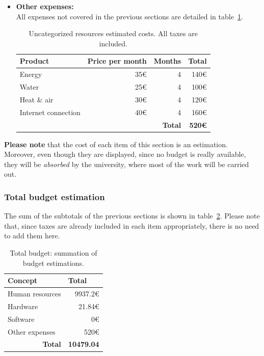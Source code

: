 \begin{itemize}
	\item \textbf{Other expenses:}\\
	All expenses not covered in the previous sections are detailed in table~\ref{table:other-resources}.
	\begin{table}[h]
	\centering
	\begin{tabular}{lrrr}
	\hline
	\textbf{Product} & \multicolumn{1}{l}{\textbf{Price per month}} & \multicolumn{1}{l}{\textbf{Months}} & \multicolumn{1}{l}{\textbf{Total}} \\ \hline
	Energy & 35€ & 4 & 140€ \\
	Water & 25€ & 4 & 100€ \\
	Heat \& air & 30€ & 4 & 120€ \\
	Internet connection & 40€ & 4 & 160€ \\ \hline
	 & \multicolumn{1}{l}{} & \textbf{Total} & \textbf{520€}
	\end{tabular}
	\caption{Uncategorized resources estimated costs. All taxes are included.}
	\label{table:other-resources}
	\end{table}
\end{itemize}

\textbf{Please note} that the cost of each item of this section is an estimation. Moreover, even though they are displayed, since no budget is really available, they will be \textit{absorbed} by the university, where most of the work will be carried out.

\subsubsection{Total budget estimation}

The sum of the subtotals of the previous sections is shown in table~\ref{table:total-resources}. Please note that, since taxes are already included in each item appropriately, there is no need to add them here.

\begin{table}[h]
\centering
\begin{tabular}{lr}
\hline
\textbf{Concept} & \multicolumn{1}{l}{\textbf{Total}} \\ \hline
Human resources & 9937.2€ \\
Hardware & 21.84€ \\
Software & 0€ \\
Other expenses & 520€ \\ \hline
\multicolumn{1}{r}{\textbf{Total}} & \multicolumn{1}{l}{\textbf{10479.04}}
\end{tabular}
\caption{Total budget: summation of budget estimations.}
\label{table:total-resources}
\end{table}

